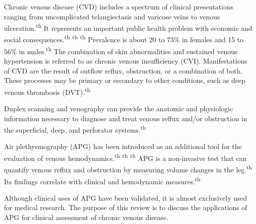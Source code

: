 \documentclass[numberinsection,times,10pt,spreadimages]{memoir}
\begin{document}
\begin{multicols}{2}
Chronic venous disease (CVD) includes a spectrum of clinical presentations
ranging
from uncomplicated telangiectasis and varicose veins to venous
ulceration.\textsuperscript{th}
It represents an important public
health problem with economic and social consequences.\textsuperscript{th}
\textsuperscript{th}
\textsuperscript{th}
Prevalence is about 20 to 73\% in females and 15 to 56\%
in males.\textsuperscript{th}
The combination of
skin abnormalities and sustained venous hypertension is referred to as chronic
venous insufficiency (CVI). Manifestations of CVD are the result of outflow
reflux,
obstruction, or a combination of both. These processes may be primary or
secondary
to other conditions, such as deep venous thrombosis (DVT).\textsuperscript{th}

Duplex scanning and venography can provide the anatomic and physiologic
information
necessary to diagnose and treat venous reflux and/or obstruction in the
superficial,
deep, and perforator systems.\textsuperscript{th}

Air plethysmography (APG) has been introduced as an additional tool for the
evaluation of venous hemodynamics.\textsuperscript{th}
\textsuperscript{th}
\textsuperscript{th}
APG is a non-invasive test that can quantify venous reflux
and obstruction by measuring volume changes in the leg.\textsuperscript{th}
Its findings correlate with clinical and
hemodynamic measures.\textsuperscript{th}

Although clinical uses of APG have been validated, it is almost exclusively used
for
medical research. The purpose of this review is to discuss the applications of
APG
for clinical assessment of chronic venous disease.



\end{multicols}
\end{document}
